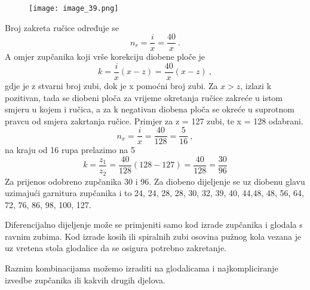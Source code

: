 \documentclass[a4paper,12pt]{article}
\numberwithin{figure}{section}
\begin{document}
\begin{figure}[!h]
\centering
\texttt{[image: image\_39.png]}
\end{figure}
\FloatBarrier
\noindent Broj zakreta ručice određuje se
\begin{equation}
n_{r} = \frac{i}{x} = \frac{40}{x}\:.
\end{equation}
A omjer zupčanika koji vrše korekciju diobene ploče je
\begin{equation}
k = \frac{i}{x}(x-z) = \frac{40}{x}(x-z)\:,
\end{equation}
gdje je z stvarni broj zubi, dok je x pomoćni broj zubi. Za $x>z$, izlazi k pozitivan, tada se diobeni ploča za vrijeme okretanja ručice zakreće u istom smjeru u kojem i ručica, a za k negativan diobena ploča se okreće u suprotnom pravcu od smjera zakrtanja ručice.
Primjer za z = 127 zubi, te x = 128 odabrani.
\begin{equation}
n_{x} = \frac{i}{x} = \frac{40}{128} = \frac{5}{16}\:,
\end{equation} 
na kraju od 16 rupa prelazimo na 5
\begin{equation}
k = \frac{z_{1}}{z_{2}} = \frac{40}{128} (128-127) = \frac{40}{128} = \frac{30}{96}
\end{equation}
Za prijenos odobreno zupčanika 30 i 96. Za diobeno dijeljenje se uz diobenu glavu uzimajući garnitura zupčanika i to 24, 24, 28, 28, 30, 32, 39, 40, 44,48, 48, 56, 64, 72, 76, 86, 98, 100, 127.\par
Diferencijalno dijeljenje može se primjeniti samo kod izrade zupčanika i glodala s ravnim zubima. Kod izrade kosih ili spiralnih zubi osovina pužnog kola vezana je uz vretena stola glodalice da se osigura potrebno zakretanje.\par
Raznim kombinacijama možemo izraditi na glodalicama i najkompliciranje izvedbe zupčanika ili kakvih drugih djelova.
\end{document}
